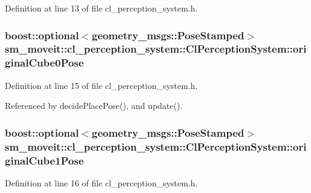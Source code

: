 Definition at line 13 of file cl\+\_\+perception\+\_\+system.\+h.

\subsubsection[{\texorpdfstring{original\+Cube0\+Pose}{originalCube0Pose}}]{\setlength{\rightskip}{0pt plus 5cm}boost\+::optional$<$geometry\+\_\+msgs\+::\+Pose\+Stamped$>$ sm\+\_\+moveit\+::cl\+\_\+perception\+\_\+system\+::\+Cl\+Perception\+System\+::original\+Cube0\+Pose}\hypertarget{classsm__moveit_1_1cl__perception__system_1_1ClPerceptionSystem_a763b8723ae96eb30fd21e039e3f52c47}{}\label{classsm__moveit_1_1cl__perception__system_1_1ClPerceptionSystem_a763b8723ae96eb30fd21e039e3f52c47}


Definition at line 15 of file cl\+\_\+perception\+\_\+system.\+h.



Referenced by decide\+Place\+Pose(), and update().

\subsubsection[{\texorpdfstring{original\+Cube1\+Pose}{originalCube1Pose}}]{\setlength{\rightskip}{0pt plus 5cm}boost\+::optional$<$geometry\+\_\+msgs\+::\+Pose\+Stamped$>$ sm\+\_\+moveit\+::cl\+\_\+perception\+\_\+system\+::\+Cl\+Perception\+System\+::original\+Cube1\+Pose}\hypertarget{classsm__moveit_1_1cl__perception__system_1_1ClPerceptionSystem_ab8851b53535efa7e154248c119e8c3cd}{}\label{classsm__moveit_1_1cl__perception__system_1_1ClPerceptionSystem_ab8851b53535efa7e154248c119e8c3cd}


Definition at line 16 of file cl\+\_\+perception\+\_\+system.\+h.



